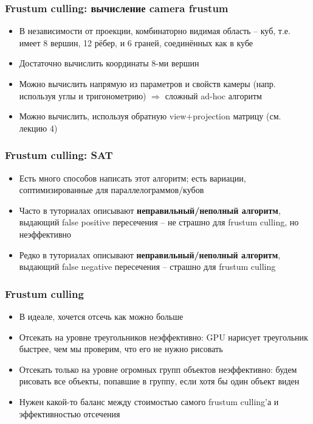 \documentclass{beamer}
\begin{document}
\begin{frame}[fragile]
\frametitle{Frustum culling: вычисление camera frustum}
\begin{itemize}
\item В независимости от проекции, комбинаторно видимая область -- куб, т.е. имеет 8 вершин, 12 рёбер, и 6 граней, соединённых как в кубе
\pause
\item Достаточно вычислить координаты 8-ми вершин
\pause
\item Можно вычислить напрямую из параметров и свойств камеры (напр. используя углы и тригонометрию) \begin{math}\Longrightarrow\end{math} сложный ad-hoc алгоритм
\pause
\item Можно вычислить, используя обратную view+projection матрицу (см. лекцию 4)
\end{itemize}
\end{frame}

\begin{frame}[fragile]
\frametitle{Frustum culling: SAT}
\begin{itemize}
\item Есть много способов написать этот алгоритм; есть вариации, соптимизированные для параллелограммов/кубов
\item Часто в туториалах описывают \textbf{неправильный/неполный алгоритм}, выдающий false positive пересечения -- не страшно для frustum culling, но неэффективно
\item Редко в туториалах описывают \textbf{неправильный/неполный алгоритм}, выдающий false negative пересечения -- страшно для frustum culling
\end{itemize}
\end{frame}

\begin{frame}[fragile]
\frametitle{Frustum culling}
\begin{itemize}
\item В идеале, хочется отсечь как можно больше
\pause
\item Отсекать на уровне треугольников неэффективно: GPU нарисует треугольник быстрее, чем мы проверим, что его не нужно рисовать
\pause
\item Отсекать только на уровне огромных групп объектов неэффективно: будем рисовать все объекты, попавшие в группу, если хотя бы один объект виден
\pause
\item Нужен какой-то баланс между стоимостью самого frustum culling'а и эффективностью отсечения
\end{itemize}
\end{frame}
\end{document}
